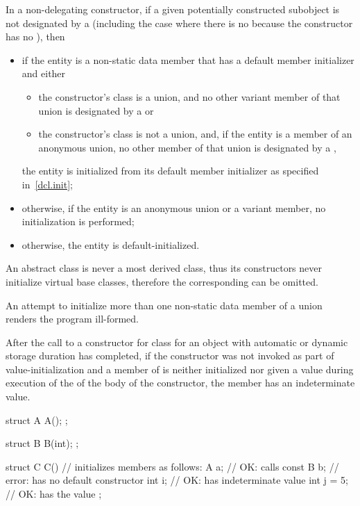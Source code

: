 \pnum
In a non-delegating constructor, if
a given potentially constructed subobject is not designated by a
(including the case where there is no
because the constructor has no
),
then
\begin{itemize}
\item if the entity is a non-static data member that has
a default member initializer and either
\begin{itemize}
\item the constructor's class is a union, and no other variant
member of that union is designated by a  or

\item the constructor's class is not a union, and, if the entity is a member of an
anonymous union, no other member of that union is designated by a
,
\end{itemize}
the entity is initialized from its default member initializer
as specified in~\ref{dcl.init};

\item otherwise, if the entity is an anonymous union or a variant member, no initialization is performed;

\item otherwise, the entity is default-initialized.
\end{itemize}

\begin{note}
An abstract class is never a most derived
class, thus its constructors never initialize virtual base classes, therefore the
corresponding  can be omitted.
\end{note}
An attempt to initialize more than one non-static data member of a union renders the
program ill-formed.
%
%
\begin{note}
After the call to a constructor for class
for an object with automatic or dynamic storage duration
has completed, if
the constructor was not invoked as part of value-initialization and
a member of
is neither initialized nor
given a value
during execution of the  of the body of the constructor,
the member has an indeterminate value.
\end{note}
\begin{example}
\begin{codeblock}
struct A {
  A();
};

struct B {
  B(int);
};

struct C {
  C() { }               // initializes members as follows:
  A a;                  // OK: calls 
  const B b;            // error:  has no default constructor
  int i;                // OK:  has indeterminate value
  int j = 5;            // OK:  has the value 
};
\end{codeblock}
\end{example}

